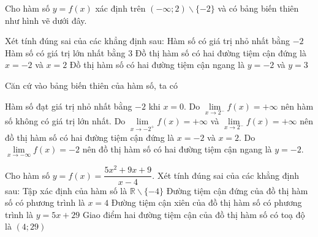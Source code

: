 \begin{ex}
\begin{ex}%
    Cho hàm số $y=f(x)$ xác định trên $(-\infty;2) \backslash\{-2\}$ và có bảng biến thiên như hình vẽ dưới đây.
    \begin{center}
    \end{center}
    Xét tính đúng sai của các khẳng định sau:
    \choiceTF
    {\True Hàm số có giá trị nhỏ nhất bằng $-2$}
    {Hàm số có giá trị lớn nhất bằng $3$}
    {\True Đồ thị hàm số có hai đường tiệm cận đứng là $x=-2$ và $x=2$}
    {Đồ thị hàm số có hai đường tiệm cận ngang là $y=-2$ và $y=3$}
    \loigiai
    {
        Căn cứ vào bảng biến thiên của hàm số, ta có
        \begin{itemchoice}
            \itemch Hàm số đạt giá trị nhỏ nhất bằng $-2$ khi $x=0$.
            \itemch Do $\lim\limits_{x\to 2^{-}}f(x)=+\infty$ nên hàm số không có giá trị lớn nhất.
            \itemch Do $\lim\limits_{x\to -2^{+}}f(x)=+\infty$ và $\lim\limits_{x\to 2^{-}}f(x)=+\infty$ nên đồ thị hàm số có hai đường tiệm cận đứng là $x=-2$ và $x=2$.
            \itemch Do $\lim\limits_{x\to -\infty}f(x)=-2$ nên đồ thị hàm số có hai đường tiệm cận ngang là $y=-2$.
    \end{itemchoice}}
\end{ex}

\begin{ex}
    Cho hàm số $y=f(x)=\dfrac{5 x^2+9 x+9}{x-4}$. Xét tính đúng sai của các khẳng định sau:
    \choiceTF
    {Tập xác định của hàm số là $\mathbb{R}\backslash\{-4\}$}
    {\True Đường tiệm cận đứng của đồ thị hàm số có phương trình là $x=4$}
    {\True Đường tiệm cận xiên của đồ thị hàm số có phương trình là $y=5x+29$}
    {Giao điểm hai đường tiệm cận của đồ thị hàm số có toạ độ là $(4;29)$}
\end{ex}


\end{ex}
